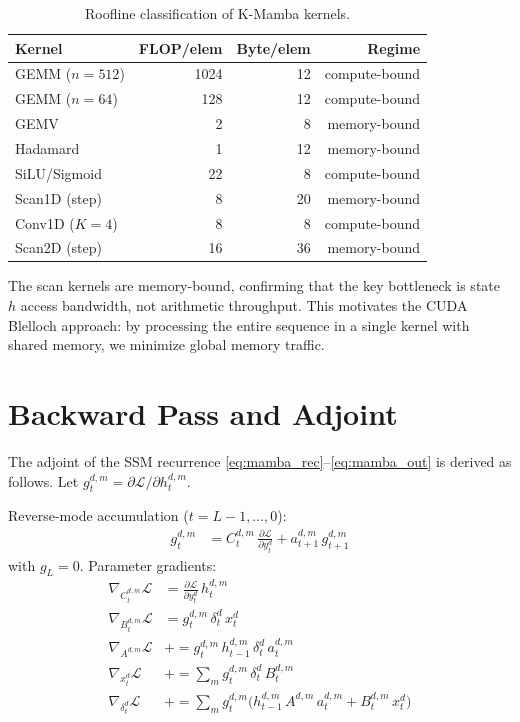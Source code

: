 \documentclass[10pt,onecolumn]{article}
\begin{document}
\begin{table}[htbp]
\centering
\caption{Roofline classification of K-Mamba kernels.}
\label{tab:roofline}
\begin{tabular}{lrrr}
\toprule
Kernel & FLOP/elem & Byte/elem & Regime \\
\midrule
GEMM ($n{=}512$) & 1024 & 12 & compute-bound \\
GEMM ($n{=}64$)  & 128  & 12 & compute-bound \\
GEMV             & 2    & 8  & memory-bound \\
Hadamard         & 1    & 12 & memory-bound \\
SiLU/Sigmoid     & 22   & 8  & compute-bound \\
Scan1D (step)    & 8    & 20 & memory-bound \\
Conv1D ($K{=}4$) & 8    & 8  & compute-bound \\
Scan2D (step)    & 16   & 36 & memory-bound \\
\bottomrule
\end{tabular}
\end{table}

The scan kernels are memory-bound, confirming that the key bottleneck
is state $h$ access bandwidth, not arithmetic throughput.
This motivates the CUDA Blelloch approach: by processing the entire
sequence in a single kernel with shared memory, we minimize global
memory traffic.

\section{Backward Pass and Adjoint}
\label{sec:backward}

The adjoint of the SSM recurrence \eqref{eq:mamba_rec}--\eqref{eq:mamba_out}
is derived as follows. Let $g_t^{d,m} = \partial \mathcal{L}/\partial h_t^{d,m}$.

Reverse-mode accumulation ($t = L{-}1, \ldots, 0$):
\begin{align}
  g_t^{d,m} &= C_t^{d,m}\,\frac{\partial\mathcal{L}}{\partial y_t^d}
             + a_{t+1}^{d,m}\,g_{t+1}^{d,m} \label{eq:adjoint_g}
\end{align}
with $g_L = 0$. Parameter gradients:
\begin{align}
  \nabla_{C_t^{d,m}}\mathcal{L} &= \frac{\partial\mathcal{L}}{\partial y_t^d}\,h_t^{d,m} \\
  \nabla_{B_t^{d,m}}\mathcal{L} &= g_t^{d,m}\,\delta_t^d\,x_t^d \\
  \nabla_{A^{d,m}}\mathcal{L}   &+= g_t^{d,m}\,h_{t-1}^{d,m}\,\delta_t^d\,a_t^{d,m} \\
  \nabla_{x_t^d}\mathcal{L}     &+= \sum_m g_t^{d,m}\,\delta_t^d\,B_t^{d,m} \\
  \nabla_{\delta_t^d}\mathcal{L} &+= \sum_m g_t^{d,m}
        \bigl(h_{t-1}^{d,m}\,A^{d,m}\,a_t^{d,m} + B_t^{d,m}\,x_t^d\bigr)
\end{align}
\end{document}
